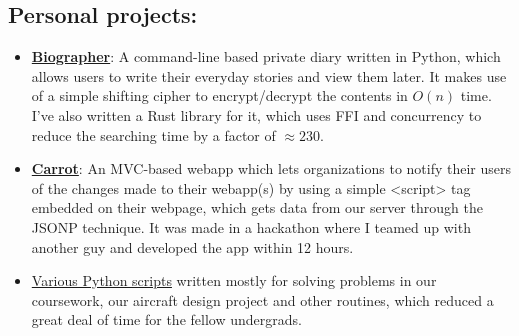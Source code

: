 \documentclass[11pt,a4paper,sans]{moderncv}        %
\newcommand\chref[3][linky]{\href{#2}{\color{#1}#3}}
\begin{document}
\subsection{Personal projects:}
\begin{itemize}
\item \textbf{\chref{https://github.com/Wafflespeanut/biographer}{Biographer}}: A command-line based private diary written in Python, which allows users to write their everyday stories and view them later. It makes use of a simple shifting cipher to encrypt/decrypt the contents in $O(n)$ time. I've also written a Rust library for it, which uses FFI and concurrency to reduce the searching time by a factor of $\approx 230$.
\item \textbf{\chref{https://github.com/joelewis/carrot}{Carrot}}: An MVC-based webapp which lets organizations to notify their users of the changes made to their webapp(s) by using a simple <script> tag embedded on their webpage, which gets data from our server through the JSONP technique. It was made in a hackathon where I teamed up with another guy and developed the app within 12 hours.
\item \chref{https://github.com/Wafflespeanut/scripts/tree/master/python}{Various Python scripts} written mostly for solving problems in our coursework, our aircraft design project and other routines, which reduced a great deal of time for the fellow undergrads.
\end{itemize}



\end{document}
